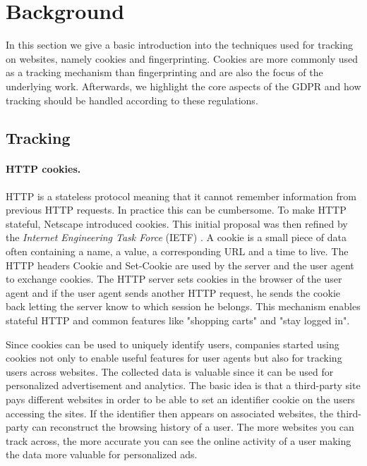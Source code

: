 \section{Background}
\label{sec:background}

In this section we give a basic introduction into the techniques used for tracking on websites, namely cookies and
fingerprinting. Cookies are more commonly used as a tracking mechanism than fingerprinting and are also the focus of
the underlying work. Afterwards, we highlight
the core aspects of the GDPR and how tracking should be handled according to these regulations.

\subsection{Tracking}

\paragraph{HTTP cookies.}

HTTP is a stateless protocol meaning that it cannot remember information from previous HTTP requests. In practice this
can be cumbersome. To make HTTP stateful, Netscape introduced cookies. This initial proposal was then refined by the
\emph{Internet Engineering Task Force} (IETF) \cite{rfc6265}. A cookie is a small piece of data often containing a name,
a value, a corresponding URL and a time to live. The HTTP headers Cookie and Set-Cookie are used by the server and the user agent to
exchange cookies. The HTTP server sets cookies in the browser of the user agent and if the user agent sends another HTTP
request, he sends the cookie back letting the server know to which session he belongs. This mechanism enables stateful
HTTP and common features like "shopping carts" and "stay logged in".

Since cookies can be used to uniquely identify users, companies started using cookies not only to enable useful features
for user agents but also for tracking users across websites. The collected data is valuable since it can be used for
personalized advertisement and analytics. The basic idea is that a third-party site pays different websites in order to be
able to set an identifier cookie on the users accessing the sites. If the identifier then appears on associated
websites, the third-party can reconstruct the browsing history of a user. The more websites you can track across, the
more accurate you can see the online activity of a user making the data more valuable for personalized ads.

